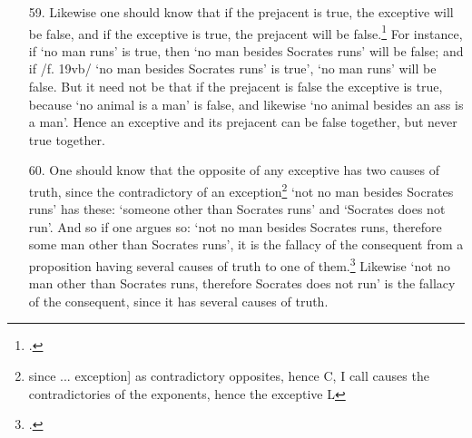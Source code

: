 \begin{itemize}
\item[59.] Likewise one should know that if the prejacent is true, the exceptive will be false, and if the exceptive is true, the prejacent will be false.\footnote{\cite[p. 169.30]{BurleyDPAL}.} For instance, if `no man runs' is true, then `no man besides Socrates runs' will be false; and if /f. 19vb/ `no man besides Socrates runs' is true', `no man runs' will be false. But it need not be that if the prejacent is false the exceptive is true, because `no animal is a man' is false, and likewise `no animal besides an ass is a man'. Hence an exceptive and its prejacent can be false together, but never true together.
\item[60.] One should know that the opposite of any exceptive has two causes of truth, since the contradictory of an exception\footnote{since ... exception] as contradictory opposites, hence C, I call causes the contradictories of the exponents, hence the exceptive L} `not no man besides Socrates runs' has these: `someone other than Socrates runs' and `Socrates does not run'. And so if one argues so: `not no man besides Socrates runs, therefore some man other than Socrates runs', it is the fallacy of the consequent from a proposition having several causes of truth to one of them.\footnote{\cite[p. 212.29]{BurleyDPAL}.} Likewise `not no man other than Socrates runs, therefore Socrates does not run' is the fallacy of the consequent, since it has several causes of truth.
\end{itemize} 
